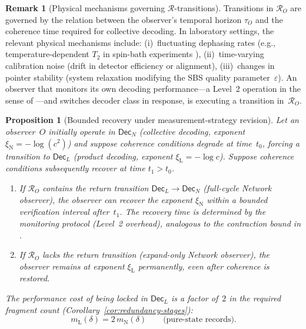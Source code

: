 \documentclass[11pt]{article}
\newcommand{\1}{\mathbf{1}}
\theoremstyle{definition}
\newtheorem{remark}{Remark}
\theoremstyle{plain}
\newtheorem{proposition}{Proposition}
\begin{document}
\begin{remark}[Physical mechanisms governing $\mathcal{R}$-transitions]
\label{rem:transition-physics}
Transitions in $\mathcal{R}_O$ are governed by the relation between the
observer's temporal horizon $\tau_O$ and the coherence time required for
collective decoding.
In laboratory settings, the relevant physical mechanisms include:
(i)~fluctuating dephasing rates (e.g., temperature-dependent $T_2$ in
spin-bath experiments \citep{Schlosshauer2007}),
(ii)~time-varying calibration noise (drift in detector efficiency or
alignment),
(iii)~changes in pointer stability (system relaxation modifying the SBS
quality parameter~$\varepsilon$).
An observer that monitors its own decoding performance---a Level~2
operation in the sense of
\citep[Sec.~2.3]{WuDLNCompression2026preprint}---and switches decoder
class in response, is executing a transition in~$\mathcal{R}_O$.
\end{remark}


\begin{proposition}[Bounded recovery under measurement-strategy revision]
\label{prop:recovery-qd}
Let an observer~$O$ initially operate in $\mathsf{Dec}_N$ (collective
decoding, exponent $\xi_{\mathrm{N}}=-\log(c^2)$) and suppose
coherence conditions degrade at time~$t_0$, forcing a transition to
$\mathsf{Dec}_L$ (product decoding, exponent $\xi_{\mathrm{L}}=-\log c$).
Suppose coherence conditions subsequently recover at time $t_1>t_0$.
\begin{enumerate}[label=(\roman*)]
\item If $\mathcal{R}_O$ contains the return transition
  $\mathsf{Dec}_L\to\mathsf{Dec}_N$ (full-cycle Network observer), the
  observer can recover the exponent $\xi_{\mathrm{N}}$ within a bounded
  verification interval after~$t_1$.
  The recovery time is determined by the monitoring protocol (Level~2
  overhead), analogous to the contraction bound in
  \citep[Proposition~1(iii)]{WuDLNCompression2026preprint}.
\item If $\mathcal{R}_O$ lacks the return transition (expand-only Network
  observer), the observer remains at exponent $\xi_{\mathrm{L}}$
  permanently, even after coherence is restored.
\end{enumerate}
The performance cost of being locked in $\mathsf{Dec}_L$ is a factor of~$2$
in the required fragment count (Corollary~\ref{cor:redundancy-stages}):
\[
  m_{\mathrm{L}}(\delta) = 2\,m_{\mathrm{N}}(\delta)
  \qquad\text{(pure-state records).}
\]
\end{proposition}
\end{document}
